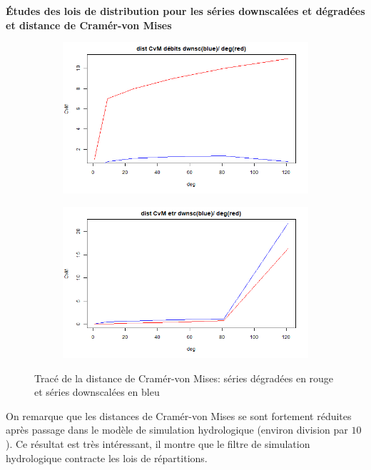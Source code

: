 \documentclass[a4paper,11pt]{article}
\numberwithin{equation}{section}
\begin{document}
\noindent\textbf{Études des lois de distribution pour les séries downscalées et dégradées et distance de Cramér-von Mises}

\begin{figure}[H]
	\label{fig-res_CVM_deb_CDFt}
	\centering
	\begin{subfigure}[b]{0.45\textwidth}
		\includegraphics[scale=0.4]{images/Dist_CVM_CDFt_deb.png}
	\end{subfigure}
	\hfill
	\begin{subfigure}[b]{0.45\textwidth}
		\includegraphics[scale=0.4]{images/Dist_CVM_CDFt_etr.png}
	\end{subfigure}
	\caption{Tracé de la distance de Cramér-von Mises: séries dégradées en rouge et séries downscalées en bleu}
\end{figure}

On remarque que les distances de Cramér-von Mises se sont fortement réduites après passage dans le modèle de simulation hydrologique (environ division par $10$). Ce résultat est très intéressant, il montre que le filtre de simulation hydrologique contracte les lois de répartitions. 
\end{document}
